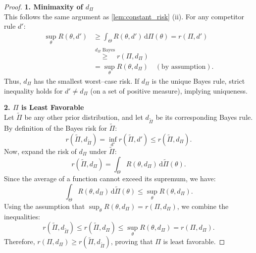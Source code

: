 \begin{proof}
    \textbf{1. Minimaxity of \(d_{\Pi}\)} \\
    This follows the same argument as \autoref{lem:constant_risk} (ii). For any competitor rule \(d'\):
    \[
    \begin{split} 
    \sup_{\theta} R(\theta, d') &\geq \int_{\Theta} R(\theta, d') \, \mathrm{d}\Pi(\theta) = r(\Pi, d') \\ 
    &\stackrel{d_{\Pi} \text{ Bayes}}{\geq} r(\Pi, d_{\Pi}) \\
    &= \sup_{\theta} R(\theta, d_{\Pi}) \quad (\text{by assumption}).
    \end{split}
    \]
    Thus, \(d_{\Pi}\) has the smallest worst--case risk. If \(d_{\Pi}\) is the unique Bayes rule, strict inequality holds for \(d' \neq d_{\Pi}\) (on a set of positive measure), implying uniqueness.

    \textbf{2. \(\Pi\) is Least Favorable} \\
    Let \(\widetilde{\Pi}\) be any other prior distribution, and let \(d_{\widetilde{\Pi}}\) be its corresponding Bayes rule. By definition of the Bayes risk for \(\widetilde{\Pi}\):
    \[
    r(\widetilde{\Pi}, d_{\widetilde{\Pi}}) = \inf_{d'} r(\widetilde{\Pi}, d') \le r(\widetilde{\Pi}, d_{\Pi}).
    \]
    Now, expand the risk of \(d_{\Pi}\) under \(\widetilde{\Pi}\):
    \[
    r(\widetilde{\Pi}, d_{\Pi}) = \int_{\Theta} R(\theta, d_{\Pi}) \, \mathrm{d}\widetilde{\Pi}(\theta).
    \]
    Since the average of a function cannot exceed its supremum, we have:
    \[
    \int_{\Theta} R(\theta, d_{\Pi}) \, \mathrm{d}\widetilde{\Pi}(\theta) \leq \sup_{\theta} R(\theta, d_{\Pi}).
    \]
    Using the assumption that \(\sup_{\theta} R(\theta, d_{\Pi}) = r(\Pi, d_{\Pi})\), we combine the inequalities:
    \[
    r(\widetilde{\Pi}, d_{\widetilde{\Pi}}) \le r(\widetilde{\Pi}, d_{\Pi}) \le \sup_{\theta} R(\theta, d_{\Pi}) = r(\Pi, d_{\Pi}).
    \]
    Therefore, \(r(\Pi, d_{\Pi}) \ge r(\widetilde{\Pi}, d_{\widetilde{\Pi}})\), proving that \(\Pi\) is least favorable.
\end{proof}


